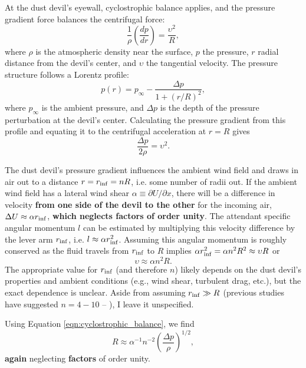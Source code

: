 \documentclass{aastex63}
\begin{document}
At the dust devil's eyewall, cyclostrophic balance applies, and the pressure gradient force balances the centrifugal force:
\begin{equation}
    \dfrac{1}{\rho}\left( \dfrac{dp}{dr} \right) = \dfrac{\upsilon^2}{R},
\end{equation}
where $\rho$ is the atmospheric density near the surface, $p$ the pressure, $r$ radial distance from the devil's center, and $\upsilon$ the tangential velocity. The pressure structure follows a Lorentz profile:
\begin{equation}
    p(r) = p_{\infty} - \dfrac{\Delta p}{1 + \left( r/R \right)^2},\label{eqn:pressure_profile}
\end{equation}
where $p_{\infty}$ is the ambient pressure, and $\Delta p$ is the depth of the pressure perturbation at the devil's center. Calculating the pressure gradient from this profile and equating it to the centrifugal acceleration at $r = R$ gives
\begin{equation}
    \dfrac{\Delta p}{2\rho} = \upsilon^2.\label{eqn:cyclostrophic_balance}
\end{equation}

The dust devil's pressure gradient influences the ambient wind field and draws in air out to a distance $r = r_{\rm inf} = n R$, i.e. some number of radii out. If the ambient wind field has a lateral wind shear $\alpha \equiv \partial U/\partial x$, there will be a difference in velocity {\bf from one side of the devil to the other} for the incoming air, $\Delta U \approx \alpha r_{\rm inf}$, {\bf which neglects factors of order unity}. The attendant specific angular momentum $l$ can be estimated by multiplying this velocity difference by the lever arm $r_{\rm inf}$, i.e. $l \approx \alpha r_{\rm inf}^2$. Assuming this angular momentum is roughly conserved as the fluid travels from $r_{\rm inf}$ to $R$ implies $\alpha r_{\rm inf}^2 = \alpha n^2 R^2 \approx \upsilon R$ or 
\begin{equation}
    \upsilon \approx \alpha n^2 R.
\end{equation}
The appropriate value for $r_{\rm inf}$ (and therefore $n$) likely depends on the dust devil's properties and ambient conditions (e.g., wind shear, turbulent drag, etc.), but the exact dependence is unclear. Aside from assuming $r_{\rm inf} \gg R$ (previous studies have suggested $n = 4-10$ -- \citealp{2001JAtS...58..927R}), I leave it unspecified.

Using Equation \ref{eqn:cyclostrophic_balance}, we find
\begin{equation}
    R \approx \alpha^{-1} n^{-2} \left( \dfrac{\Delta p}{\rho} \right)^{1/2},\label{eqn:R_vs_Delta-p}
\end{equation}
{\bf again} neglecting {\bf factors} of order unity. 
\end{document}

